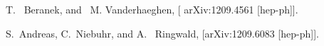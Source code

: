 T. ~Beranek, and ~M. Vanderhaeghen, [	arXiv:1209.4561 [hep-ph]].

S.~Andreas, C.~Niebuhr, and A. ~Ringwald,  [arXiv:1209.6083 [hep-ph]].



